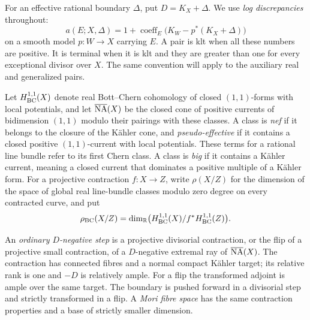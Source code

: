 For an effective rational boundary $\Delta$, put $D=K_X+\Delta$.
We use \emph{log discrepancies} throughout:
\[
 a(E;X,\Delta)
 =1+\operatorname{coeff}_E\bigl(K_W-p^*(K_X+\Delta)\bigr)
\]
on a smooth model $p:W\to X$ carrying $E$. A pair is klt when all these
numbers are positive. It is terminal when it is klt and they are greater
than one for every exceptional divisor over $X$. The same convention
will apply to the auxiliary real and generalized pairs.

Let $H^{1,1}_{\mathrm{BC}}(X)$ denote real Bott--Chern cohomology of closed $(1,1)$-forms
with local potentials, and let $\overline{\mathrm{NA}}(X)$ be the closed cone of positive
currents of bidimension $(1,1)$ modulo their pairings with these classes.
A class is \emph{nef} if it belongs to the closure of the Kähler cone,
and \emph{pseudo-effective} if it contains a closed positive
$(1,1)$-current with local potentials. These terms for a rational line
bundle refer to its first Chern class. A class is \emph{big} if it
contains a Kähler current, meaning a closed current that dominates
a positive multiple of a Kähler form.
For a projective contraction
$f:X\to Z$, write $\rho(X/Z)$ for the dimension of the space of global
real line-bundle classes modulo zero degree on every contracted curve,
and put
\[
 \rho_{\mathrm{BC}}(X/Z)
 =\dim_{\mathbb R}\bigl(H^{1,1}_{\mathrm{BC}}(X)/f^*H^{1,1}_{\mathrm{BC}}(Z)\bigr).
\]

An \emph{ordinary $D$-negative step} is a projective divisorial
contraction, or the flip of a projective small contraction, of a
$D$-negative extremal ray of $\overline{\mathrm{NA}}(X)$. The contraction has connected
fibres and a normal compact Kähler target; its relative rank is one and
$-D$ is relatively ample. For a flip the transformed adjoint is ample
over the same target. The boundary is pushed forward in a divisorial
step and strictly transformed in a flip. A \emph{Mori fibre space} has
the same contraction properties and a base of strictly smaller
dimension.


